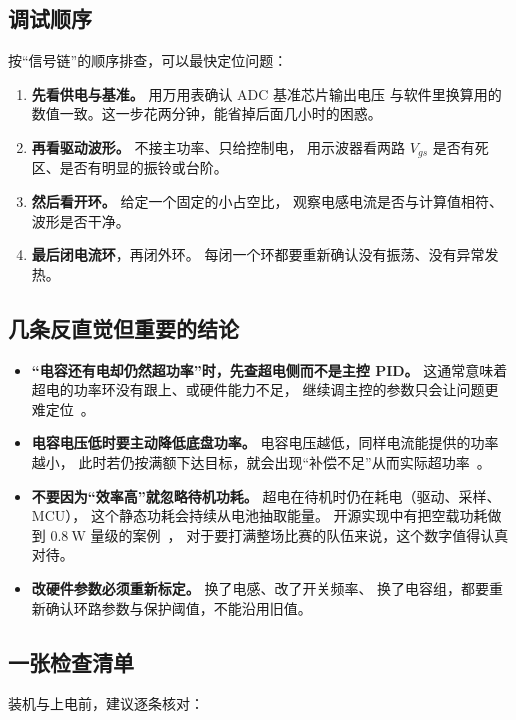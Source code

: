 \documentclass[cn,blue,11pt,device=normal]{elegantnote}
\begin{document}
\subsection{调试顺序}

按“信号链”的顺序排查，可以最快定位问题：

\begin{enumerate}
  \item \textbf{先看供电与基准。} 用万用表确认 ADC 基准芯片输出电压
  与软件里换算用的数值一致。这一步花两分钟，能省掉后面几小时的困惑。
  \item \textbf{再看驱动波形。} 不接主功率、只给控制电，
  用示波器看两路 $V_{gs}$ 是否有死区、是否有明显的振铃或台阶。
  \item \textbf{然后看开环。} 给定一个固定的小占空比，
  观察电感电流是否与计算值相符、波形是否干净。
  \item \textbf{最后闭电流环}，再闭外环。
  每闭一个环都要重新确认没有振荡、没有异常发热。
\end{enumerate}

\subsection{几条反直觉但重要的结论}

\begin{itemize}
  \item \textbf{“电容还有电却仍然超功率”时，先查超电侧而不是主控 PID。}
  这通常意味着超电的功率环没有跟上、或硬件能力不足，
  继续调主控的参数只会让问题更难定位~\cite{zjuwiki}。
  \item \textbf{电容电压低时要主动降低底盘功率。}
  电容电压越低，同样电流能提供的功率越小，
  此时若仍按满额下达目标，就会出现“补偿不足”从而实际超功率~\cite{hitszsupercap}。
  \item \textbf{不要因为“效率高”就忽略待机功耗。}
  超电在待机时仍在耗电（驱动、采样、MCU），
  这个静态功耗会持续从电池抽取能量。
  开源实现中有把空载功耗做到 $0.8\ \mathrm{W}$ 量级的案例~\cite{hkustgzpnx}，
  对于要打满整场比赛的队伍来说，这个数字值得认真对待。
  \item \textbf{改硬件参数必须重新标定。} 换了电感、改了开关频率、
  换了电容组，都要重新确认环路参数与保护阈值，不能沿用旧值。
\end{itemize}

\subsection{一张检查清单}

装机与上电前，建议逐条核对：
\end{document}
